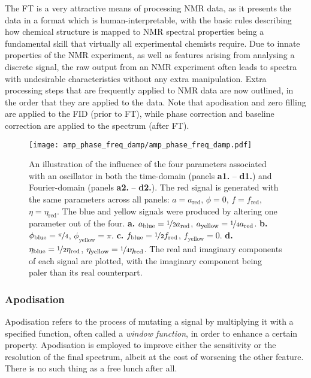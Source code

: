 The \ac{FT} is a very attractive means of processing \ac{NMR} data, as it
presents the data in a format which is human-interpretable, with the basic
rules describing how chemical structure is mapped to \ac{NMR} spectral
properties being a fundamental skill that virtually all experimental chemists
require\cite{Hore2015b}. Due to innate properties of the \ac{NMR} experiment,
as well as features arising from analysing a discrete signal, the raw output
from an \ac{NMR} experiment often leads to spectra with undesirable
characteristics without any extra manipulation. Extra processing
steps that are frequently applied to \ac{NMR} data are now outlined, in the
order that they are applied to the data. Note that apodisation and zero filling
are applied to the \ac{FID} (prior to \ac{FT}), while phase correction and
baseline correction are applied to the spectrum (after \ac{FT}).

\begin{figure}
    \centering
    \texttt{[image: amp\_phase\_freq\_damp/amp\_phase\_freq\_damp.pdf]}
    \caption[
        An illustration of the influence of the four parameters associated
        with an oscillator in both the time-domain nels and Fourier-domain.
    ]{
        An illustration of the influence of the four parameters associated
        with an oscillator in both the time-domain (panels \textbf{a1.} --
        \textbf{d1.}) and Fourier-domain (panels \textbf{a2.} -- \textbf{d2.}).
        The red signal is generated with the same parameters across all panels:
        $a = a_{\text{red}}$, $\phi = 0$, $f = f_{\text{red}}$,  $\eta =
        \eta_{\text{red}}$.  The blue and yellow signals were produced by
        altering one parameter out of the four.
        \textbf{a.}
        $a_{\text{blue}} = \nicefrac{1}{2} a_{\text{red}}$,
        $a_{\text{yellow}} = \nicefrac{1}{4} a_{\text{red}}$.
        \textbf{b.}
        $\phi_{\text{blue}} = \nicefrac{\pi}{4}$,
        $\phi_{\text{yellow}} = \pi$.
        \textbf{c.}
        $f_{\text{blue}} = \nicefrac{1}{2} f_{\text{red}}$,
        $f_{\text{yellow}} = 0$.
        \textbf{d.}
        $\eta_{\text{blue}} = \nicefrac{1}{2}\eta_{\text{red}}$,
        $\eta_{\text{yellow}} = \nicefrac{1}{4}\eta_{\text{red}}$.
        The real and imaginary components of each signal are plotted, with the
        imaginary component being paler than its real counterpart.
    }
    \label{fig:amp-phase-freq-damp}
\end{figure}



\subsubsection{Apodisation}
Apodisation refers to the process of mutating a signal by multiplying it with a
specified function, often called a \emph{window function}, in order to enhance
a certain property. Apodisation is employed to improve either the sensitivity
or the resolution of the final spectrum, albeit at the cost of worsening the
other feature. There is no such thing as a free lunch after all.

